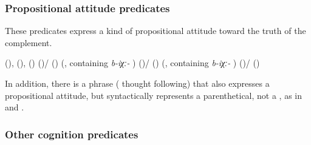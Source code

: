 
\subsubsection{Propositional attitude predicates}
\label{sssec:Propositional attitude predicates}

These predicates express a kind of propositional attitude toward the truth of the complement.
%
\begin{exe}
	\ex	\label{ex:propositional attitude predicates}
	\begin{xlist}
		\ex	{} (),  (),  () 
		\ex	{} 
		\ex	{} ()\slash{} ()  (, containing \textit{b-iχː-} )
		\ex	{} ()\slash{} ()  (, containing \textit{b-iχː-} )
		\ex	{} ()\slash{} () 
	\end{xlist}
\end{exe}

In addition, there is a phrase    ( thought following) that also expresses a propositional attitude, but syntactically represents a parenthetical, not a , as in  and .



\subsubsection{Other cognition predicates}
\label{sssec:Other cognition predicates}

